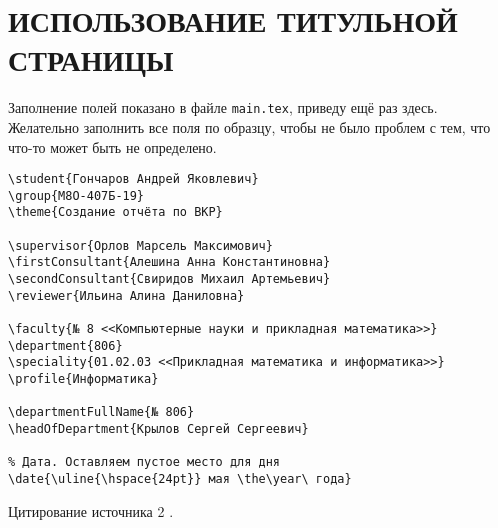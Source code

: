 \section{ИСПОЛЬЗОВАНИЕ ТИТУЛЬНОЙ СТРАНИЦЫ}

Заполнение полей показано в файле \texttt{main.tex}, приведу ещё раз здесь. 
Желательно заполнить все поля по образцу, чтобы не было проблем с тем, 
что что-то может быть не определено.

\begingroup
\fontsize{10pt}{12pt}\selectfont
\begin{verbatim}
\student{Гончаров Андрей Яковлевич}
\group{М8О-407Б-19}
\theme{Создание отчёта по ВКР}

\supervisor{Орлов Марсель Максимович}
\firstConsultant{Алешина Анна Константиновна}
\secondConsultant{Свиридов Михаил Артемьевич}
\reviewer{Ильина Алина Даниловна}

\faculty{№ 8 <<Компьютерные науки и прикладная математика>>}
\department{806}
\speciality{01.02.03 <<Прикладная математика и информатика>>}
\profile{Информатика}

\departmentFullName{№ 806}
\headOfDepartment{Крылов Сергей Сергеевич}

% Дата. Оставляем пустое место для дня
\date{\uline{\hspace{24pt}} мая \the\year\ года}
\end{verbatim}
\endgroup

Цитирование источника 2 \cite{Wikipedia2}.